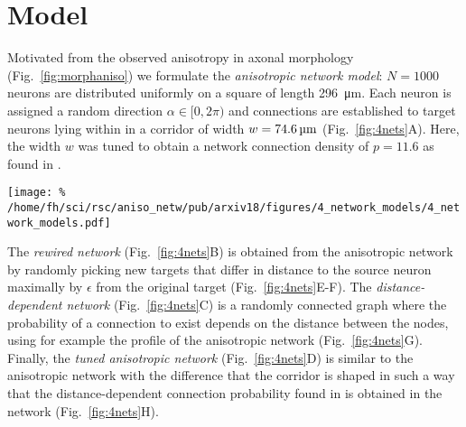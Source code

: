 
\section*{Model}
\vspace{-0.2cm}

Motivated from the observed anisotropy in axonal morphology (Fig.~\ref{fig:morphaniso}) we formulate the \textit{anisotropic network model}: $N=1000$ neurons are distributed uniformly on a square of length \SI{296}{\micro\meter}. Each neuron is assigned a random direction $\alpha \in [0,2\pi)$ and connections are established to target neurons lying within in a corridor of width $w=\text{\SI{74.6}{\micro\meter}}$ (Fig.~\ref{fig:4nets}A). Here, the width $w$ was tuned to obtain a network connection density of $p=11.6$ as found in \cite{Song2005}.

\begin{center}\vspace{0.3cm}
  \texttt{[image: \%
    /home/fh/sci/rsc/aniso\_netw/pub/arxiv18/figures/4\_network\_models/4\_network\_models.pdf]}
  \label{fig:4nets}
\end{center}\vspace{2cm}

The \textit{rewired network} (Fig.~\ref{fig:4nets}B) is obtained from the anisotropic network by randomly picking new targets that differ in distance to the source neuron maximally by $\epsilon$ from the original target (Fig.~\ref{fig:4nets}E-F). The \textit{distance-dependent network} (Fig.~\ref{fig:4nets}C) is a randomly connected graph where the probability of a connection to exist depends on the distance between the nodes, using for example the profile of the anisotropic network (Fig.~\ref{fig:4nets}G). Finally, the \textit{tuned anisotropic network} (Fig.~\ref{fig:4nets}D) is similar to the anisotropic network with the difference that the corridor is shaped in such a way that the distance-dependent connection probability found in \cite{Perin2011} is obtained in the network (Fig.~\ref{fig:4nets}H).



